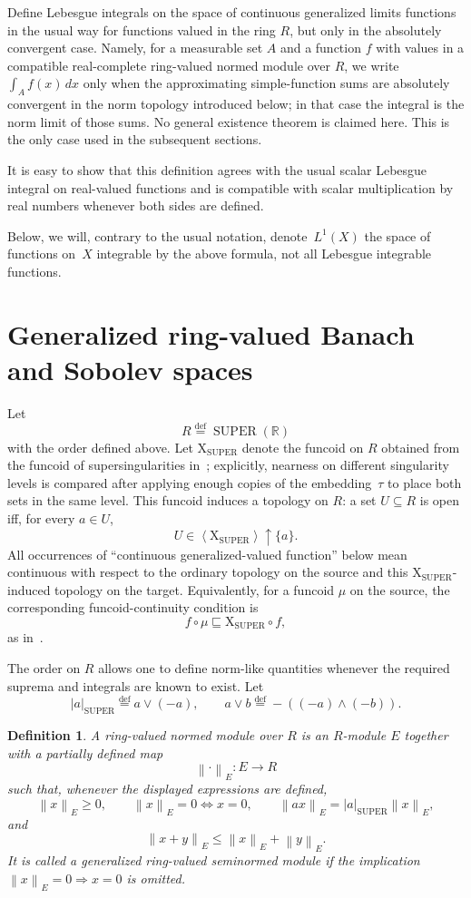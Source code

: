 \documentclass{amsart}
\newtheorem{defn}{Definition}
\DeclareMathOperator{\SUPER}{SUPER}
\newcommand{\eqdef}{\overset{\mathrm{def}}{=}}
\newcommand{\norm}[1]{\left\lVert #1\right\rVert}
\newcommand{\abs}[1]{\left\lvert #1\right\rvert}
\newcommand{\supfun}[1]{\left\langle #1\right\rangle}
\begin{document}
Define Lebesgue integrals on the space of continuous generalized limits
functions in the usual way for functions valued in the ring $R$, but only in the
absolutely convergent case.  Namely, for a measurable set $A$ and a function
$f$ with values in a compatible real-complete ring-valued normed module over
$R$, we
write $\int_A f(x)\,dx$ only when the approximating simple-function sums are
absolutely convergent in the norm topology introduced below; in that case the
integral is the norm limit of those sums.  No general existence theorem is
claimed here.  This is the only case used in the subsequent sections.

It is easy to show that this definition agrees with the usual scalar Lebesgue
integral on real-valued functions and is compatible with scalar multiplication
by real numbers whenever both sides are defined.

Below, we will, contrary to the usual notation, denote~$L^1(X)$ the space of functions on~$X$ integrable by the above formula, not all Lebesgue integrable functions.

\section{Generalized ring-valued Banach and Sobolev spaces}

Let
\[
  R\eqdef\SUPER(\mathbb{R})
\]
with the order defined above.  Let $\mathrm{X}_{\SUPER}$ denote the funcoid on
$R$ obtained from the funcoid of supersingularities in~\cite[section 10,
p.~11]{limit}; explicitly, nearness on different singularity levels is
compared after applying enough copies of the embedding~$\tau$ to place both
sets in the same level.  This funcoid induces a topology on $R$: a set
$U\subseteq R$ is open iff, for every $a\in U$,
\[
  U\in\supfun{\mathrm{X}_{\SUPER}}{\uparrow}\{a\}.
\]
All occurrences of ``continuous generalized-valued function'' below mean
continuous with respect to the ordinary topology on the source and this
$\mathrm{X}_{\SUPER}$-induced topology on the target.  Equivalently, for a
funcoid $\mu$ on the source, the corresponding funcoid-continuity condition is
\[
  f\circ\mu\sqsubseteq \mathrm{X}_{\SUPER}\circ f,
\]
as in~\cite[p.~7]{limit}.

The order on $R$ allows one to define norm-like quantities whenever the
required suprema and integrals are known to exist.  Let
\[
  \abs{a}_{\SUPER}\eqdef a\vee(-a),\qquad
  a\vee b\eqdef -((-a)\wedge(-b)).
\]

\begin{defn}
A ring-valued normed module over $R$ is an $R$-module $E$ together with a
partially defined map
\[
  \norm{\cdot}_E:E\to R
\]
such that, whenever the displayed expressions are defined,
\[
  \norm{x}_E\geq0,\qquad
  \norm{x}_E=0\Longleftrightarrow x=0,\qquad
  \norm{ax}_E=\abs{a}_{\SUPER}\norm{x}_E,
\]
and
\[
  \norm{x+y}_E\leq\norm{x}_E+\norm{y}_E.
\]
It is called a generalized ring-valued seminormed module if the implication
$\norm{x}_E=0\Rightarrow x=0$ is omitted.
\end{defn}
\end{document}
